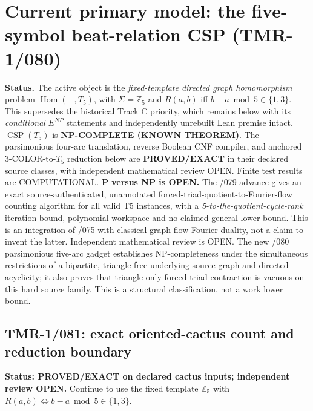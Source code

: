 \documentclass[11pt]{article}
\begin{document}
\section{Current primary model: the five-symbol beat-relation CSP (TMR-1/080)}
\noindent\textbf{Status.}
The active object is the \emph{fixed-template directed graph homomorphism}
problem $\operatorname{Hom}(-,T_5)$, with
$\Sigma=\mathbb Z_5$ and $R(a,b)$ iff $b-a\bmod5\in\{1,3\}$.
This supersedes the historical Track C priority, which remains below
with its \emph{conditional} $E^{NP}$ statements and independently
unrebuilt Lean premise intact.
$\operatorname{CSP}(T_5)$ is \textbf{NP-COMPLETE (KNOWN THEOREM)}.
The parsimonious four-arc translation, reverse Boolean CNF compiler,
and anchored 3-COLOR-to-$T_5$ reduction below are
\textbf{PROVED/EXACT} in their declared source classes, with independent
mathematical review OPEN.
Finite test results are COMPUTATIONAL. \textbf{P versus NP is OPEN.}
The /079 advance gives an exact source-authenticated, unannotated
forced-triad-quotient-to-Fourier-flow counting algorithm for all valid
T5 instances, with a \emph{5-to-the-quotient-cycle-rank} iteration bound,
polynomial workspace and no claimed general lower bound. This is an
integration of /075 with classical graph-flow Fourier duality, not a
claim to invent the latter. Independent mathematical review is OPEN.
The new /080 parsimonious five-arc gadget establishes NP-completeness
under the simultaneous restrictions of a bipartite, triangle-free
underlying source graph and directed acyclicity; it also proves that
triangle-only forced-triad contraction is vacuous on this hard source
family. This is a structural classification, not a work lower bound.

\subsection{TMR-1/081: exact oriented-cactus count and reduction boundary}
\noindent\textbf{Status: PROVED/EXACT on declared cactus inputs; independent review OPEN.}
Continue to use the fixed template $\mathbb Z_5$ with
$R(a,b)\Leftrightarrow b-a\bmod5\in\{1,3\}$.
\end{document}
